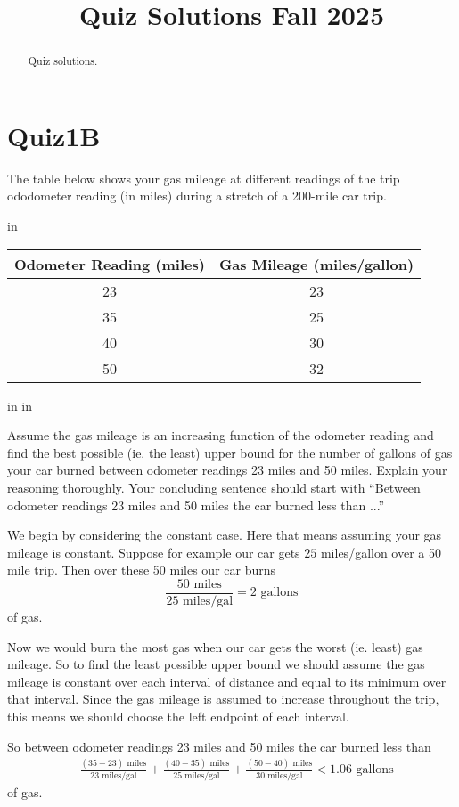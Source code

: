\documentclass{ximera}
\title{Quiz Solutions Fall 2025}
\newcommand{\pskip}{\vskip 0.1 in}
\begin{document}
\begin{abstract}
Quiz solutions.
\end{abstract}
\maketitle

\section{Quiz1B}

\begin{question}  \label{QOERrfrefr}
The table below shows your gas mileage at different readings of the trip ododometer reading (in miles) during a stretch of a 200-mile car trip.

\pskip

\begin{tabular}{|c|c|}
\hline
Odometer Reading (miles) & Gas Mileage (miles/gallon) \\
\hline
23 & 23 \\  \hline
35 & 25 \\ \hline
40 & 30 \\ \hline
50 & 32 \\ \hline
\end{tabular}

\pskip \pskip

Assume the gas mileage is an increasing function of the odometer reading and find the best possible (ie. the least) upper bound for the number of gallons of gas your car burned between odometer readings 23 miles and 50 miles. Explain your reasoning thoroughly. Your concluding sentence should start with ``Between odometer readings 23 miles and 50 miles the car burned less than ...''
\end{question}

\begin{explanation}
We begin by considering the constant case. Here that means assuming your gas mileage is constant. Suppose for example our car gets $25$ miles/gallon over a 50 mile trip. Then over these 50 miles our car burns
\[
   \frac{50 \text{ miles}}{25 \text{ miles/gal}} = 2\text{ gallons}
\]
of gas.

Now we would burn the most gas when our car gets the worst (ie. least) gas mileage. So to find the least possible upper bound we should assume the gas mileage is constant over each interval of distance and equal to its minimum over that interval. Since the gas  mileage is assumed to increase throughout the trip, this means we should choose the left endpoint of each interval.

So between  odometer readings 23 miles and 50 miles the car burned less than
\begin{align*}
& \frac{(35-23)\text{ miles}}{23\text{ miles/gal}} + \frac{(40-35)\text{ miles}}{25\text{ miles/gal}} +  \frac{(50-40)\text{ miles}}{30\text{ miles/gal}}          < 1.06 \text{ gallons} 
\end{align*}
of gas.
\end{explanation}
\end{document}
